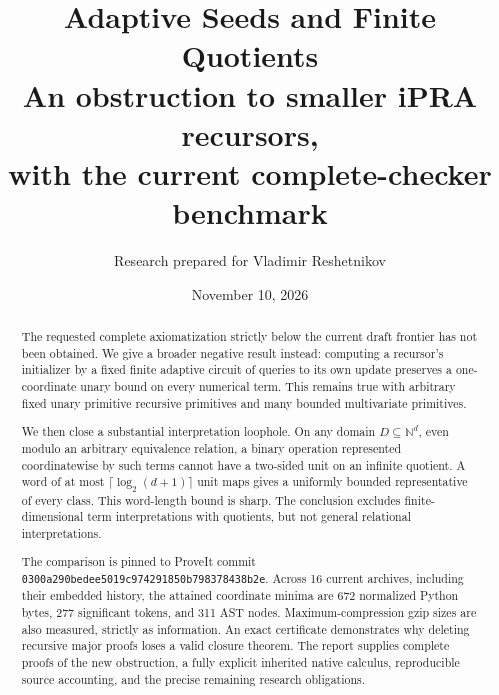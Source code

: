\documentclass[11pt]{article}
\title{\color{ink}\textbf{Adaptive Seeds and Finite Quotients}\\[0.45em]
 \large An obstruction to smaller iPRA recursors,\\
 with the current complete-checker benchmark}
\author{Research prepared for Vladimir Reshetnikov}
\date{November 10, 2026}
\newcommand{\N}{\mathbb N}
\newcommand{\file}[1]{\texttt{\nolinkurl{#1}}}
\begin{document}
\maketitle
\begin{abstract}
The requested complete axiomatization strictly below the current draft
frontier has not been obtained. We give a broader negative result instead:
computing a recursor's initializer by a fixed finite adaptive circuit of
queries to its own update preserves a one-coordinate unary bound on every
numerical term. This remains true with arbitrary fixed unary primitive
recursive primitives and many bounded multivariate primitives.

We then close a substantial interpretation loophole. On any domain
$D\subseteq\N^d$, even modulo an arbitrary equivalence relation, a binary
operation represented coordinatewise by such terms cannot have a two-sided
unit on an infinite quotient. A word of at most
$\lceil\log_2(d+1)\rceil$ unit maps gives a uniformly bounded representative
of every class. This word-length bound is sharp. The conclusion excludes
finite-dimensional term interpretations with quotients, but not general
relational interpretations.

The comparison is pinned to ProveIt commit
\file{0300a290bedee5019c974291850b798378438b2e}. Across 16 current archives,
including their embedded history, the attained coordinate minima are
672 normalized Python bytes, 277 significant tokens, and 311 AST nodes.
Maximum-compression gzip sizes are also measured, strictly as information.
An exact certificate demonstrates why deleting recursive major proofs
loses a valid closure theorem. The report supplies complete proofs of the
new obstruction, a fully explicit inherited native calculus, reproducible
source accounting, and the precise remaining research obligations.
\end{abstract}
\begin{center}
\end{center}
\clearpage
\begingroup\small\setcounter{tocdepth}{1}\tableofcontents\endgroup
\clearpage
\end{document}
